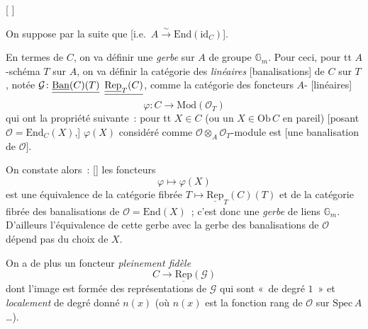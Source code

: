 \documentclass[11pt,a4paper]{article}
\begin{document}
[\ill{} ]

On suppose par la suite que  [i.e.\ $A \xrightarrow{\sim}
\mathrm{End}(\mathrm{id}_C)$].

En termes de $C$, on va définir une \emph{gerbe} sur $A$ de groupe $\mathbb{G}_m$. Pour ceci, pour tt
$A$-schéma $T$ sur $A$, on va définir la catégorie des \struck{\ill{}} \emph{linéaires} [banalisations]
de $C$ sur $T$, notée $\mathcal{G} \colon \struck{\underline{\mathrm{Ban}}(C)(T)}$
$\struck{\underline{\mathrm{Rep}}_T(C)}$, comme la catégorie des foncteurs $A$-\struck{\ill{}}
[linéaires]
\[
  \varphi \colon C \longrightarrow \mathrm{Mod}(\mathcal{O}_{T})
\]
qui ont la propriété suivante~: pour tt $X \in C$ (ou un $X \in \mathrm{Ob}\, C$ en pareil)
 [posant $\mathcal{O} = \mathrm{End}_C(X)$,] $\varphi(X)$ considéré comme
$\mathcal{O} \otimes_A \mathcal{O}_T$-module est 
[une banalisation de $\mathcal{O}$].

On constate alors~: \struck{\ill{}} [\ill{}] les foncteurs
\[
  \varphi \longmapsto \varphi(X)
\]
est une équivalence de la catégorie fibrée $T \mapsto \underline{\mathrm{Rep}}_T(C)(T)$ et de la
catégorie fibrée  des banalisations de
$\mathcal{O} = \mathrm{End}(X)$~; c'est donc une \emph{gerbe} de liens $\mathbb{G}_m$. D'ailleurs
l'équivalence de cette gerbe avec la gerbe des banalisations de $\mathcal{O}$  dépend pas
du choix de $X$.

\struck{\ill{}} On a de plus un foncteur \emph{pleinement fidèle}
\[
  C \longrightarrow \underline{\mathrm{Rep}}(\mathcal{G})
\]
dont l'image est formée des représentations de $\mathcal{G}$ qui sont «~de degré $1$~» et
\emph{localement} \struck{\ill{}} de degré donné $n(x)$ (où $n(x)$ est la fonction rang de
$\mathcal{O}$ sur $\mathrm{Spec}\, A$ …).
\end{document}
